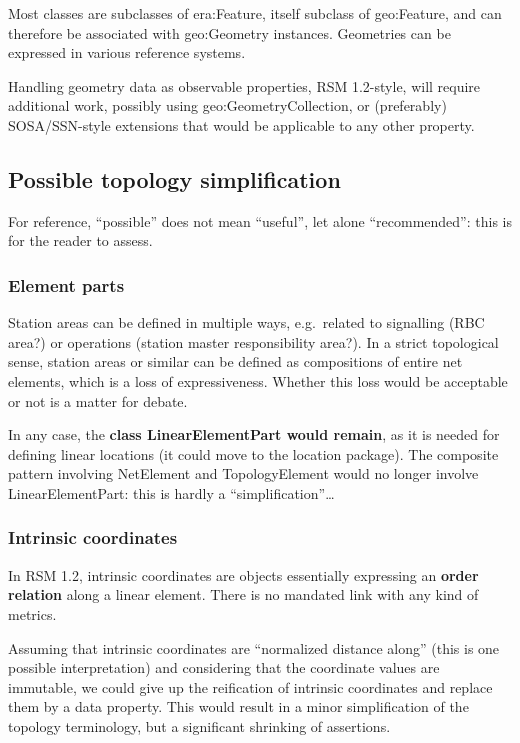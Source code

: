 \documentclass[
  11pt,
]{article}
\begin{document}
Most classes are subclasses of era:Feature, itself subclass of
geo:Feature, and can therefore be associated with geo:Geometry
instances. Geometries can be expressed in various reference systems.

Handling geometry data as observable properties, RSM 1.2-style, will
require additional work, possibly using geo:GeometryCollection, or
(preferably) SOSA/SSN-style extensions that would be applicable to any
other property.

\hypertarget{possible-topology-simplification}{%
\subsection{Possible topology
simplification}\label{possible-topology-simplification}}

For reference, ``possible'' does not mean ``useful'', let alone
``recommended'': this is for the reader to assess.

\hypertarget{element-parts-1}{%
\subsubsection{Element parts}\label{element-parts-1}}

Station areas can be defined in multiple ways, e.g.~related to
signalling (RBC area?) or operations (station master responsibility
area?). In a strict topological sense, station areas or similar can be
defined as compositions of entire net elements, which is a loss of
expressiveness. Whether this loss would be acceptable or not is a matter
for debate.

In any case, the \textbf{class LinearElementPart would remain}, as it is
needed for defining linear locations (it could move to the location
package). The composite pattern involving NetElement and TopologyElement
would no longer involve LinearElementPart: this is hardly a
``simplification''\ldots{}

\hypertarget{intrinsic-coordinates}{%
\subsubsection{Intrinsic coordinates}\label{intrinsic-coordinates}}

In RSM 1.2, intrinsic coordinates are objects essentially expressing an
\textbf{order relation} along a linear element. There is no mandated
link with any kind of metrics.

Assuming that intrinsic coordinates are ``normalized distance along''
(this is one possible interpretation) and considering that the
coordinate values are immutable, we could give up the reification of
intrinsic coordinates and replace them by a data property. This would
result in a minor simplification of the topology terminology, but a
significant shrinking of assertions.
\end{document}

